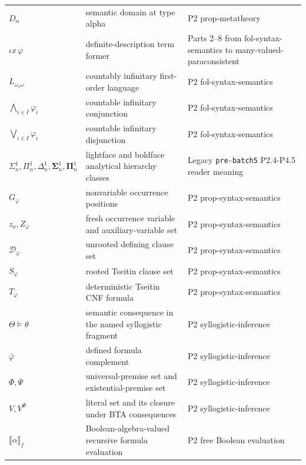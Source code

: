 \begin{longtable}{@{}p{}p{}p{}@{}}
\(D_\alpha\) & semantic domain at type alpha & P2 prop-\allowbreak{}metatheory \\
\(\iota x\,\varphi\) & definite-description term former & Parts 2--8 from fol-\allowbreak{}syntax-\allowbreak{}semantics to many-\allowbreak{}valued-\allowbreak{}paraconsistent \\
\(L_{\omega_1\omega}\) & countably infinitary first-order language & P2 fol-\allowbreak{}syntax-\allowbreak{}semantics \\
\(\bigwedge_{i\in I}\varphi_i\) & countable infinitary conjunction & P2 fol-\allowbreak{}syntax-\allowbreak{}semantics \\
\(\bigvee_{i\in I}\varphi_i\) & countable infinitary disjunction & P2 fol-\allowbreak{}syntax-\allowbreak{}semantics \\
\(\Sigma^1_n,\allowbreak \Pi^1_n,\allowbreak \Delta^1_n,\allowbreak \boldsymbol\Sigma^1_n,\allowbreak \boldsymbol\Pi^1_n\) & lightface and boldface analytical hierarchy classes & Legacy \texttt{pre-\allowbreak{}batch5} P2.\allowbreak{}4-\allowbreak{}P4.\allowbreak{}5 reader meaning \\
\(G_\varphi\) & nonvariable occurrence positions & P2 prop-\allowbreak{}syntax-\allowbreak{}semantics \\
\(z_a,\allowbreak Z_\varphi\) & fresh occurrence variable and auxiliary-variable set & P2 prop-\allowbreak{}syntax-\allowbreak{}semantics \\
\(\mathcal D_\varphi\) & unrooted defining clause set & P2 prop-\allowbreak{}syntax-\allowbreak{}semantics \\
\(S_\varphi\) & rooted Tseitin clause set & P2 prop-\allowbreak{}syntax-\allowbreak{}semantics \\
\(T_\varphi\) & deterministic Tseitin CNF formula & P2 prop-\allowbreak{}syntax-\allowbreak{}semantics \\
\(\Theta\models\theta\) & semantic consequence in the named syllogistic fragment & P2 syllogistic-\allowbreak{}inference \\
\(\bar\varphi\) & defined formula complement & P2 syllogistic-\allowbreak{}inference \\
\(\Phi,\allowbreak \Psi\) & universal-premise set and existential-premise set & P2 syllogistic-\allowbreak{}inference \\
\(V,\allowbreak V^\Phi\) & literal set and its closure under BTA consequences & P2 syllogistic-\allowbreak{}inference \\
\(\llbracket\alpha\rrbracket_f\) & Boolean-algebra-valued recursive formula evaluation & P2 free Boolean evaluation \\

\end{longtable}
